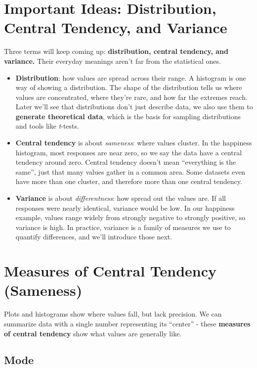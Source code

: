 \documentclass[
  letterpaper,
  DIV=11,
  numbers=noendperiod]{scrreprt}
\begin{document}
\section{Important Ideas: Distribution, Central Tendency, and
Variance}\label{important-ideas-distribution-central-tendency-and-variance}

Three terms will keep coming up: \textbf{distribution, central tendency,
and variance.} Their everyday meanings aren't far from the statistical
ones.

\begin{itemize}
\item
  \textbf{Distribution}: how values are spread across their range. A
  histogram is one way of showing a distribution. The shape of the
  distribution tells us where values are concentrated, where they're
  rare, and how far the extremes reach. Later we'll see that
  distributions don't just describe data, we also use them to
  \textbf{generate theoretical data}, which is the basis for sampling
  distributions and tools like \emph{t}-tests.
\item
  \textbf{Central tendency} is about \emph{sameness}: where values
  cluster. In the happiness histogram, most responses are near zero, so
  we say the data have a central tendency around zero. Central tendency
  doesn't mean ``everything is the same'', just that many values gather
  in a common area. Some datasets even have more than one cluster, and
  therefore more than one central tendency.
\item
  \textbf{Variance} is about \emph{differentness}: how spread out the
  values are. If all responses were nearly identical, variance would be
  low. In our happiness example, values range widely from strongly
  negative to strongly positive, so variance is high. In practice,
  variance is a family of measures we use to quantify differences, and
  we'll introduce those next.
\end{itemize}

\section{Measures of Central Tendency
(Sameness)}\label{measures-of-central-tendency-sameness}

Plots and histograms show where values fall, but lack precision. We can
summarize data with a single number representing its ``center'' - these
\textbf{measures of central tendency} show what values are generally
like.

\subsection{Mode}\label{mode}
\end{document}
